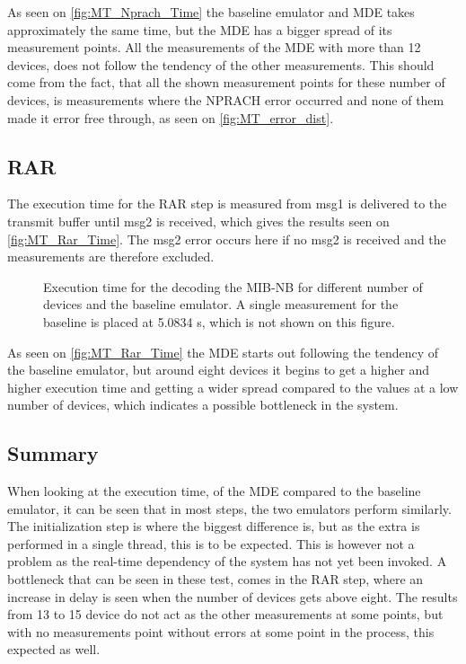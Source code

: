 As seen on \autoref{fig:MT_Nprach_Time} the baseline emulator and MDE takes approximately the same time, but the MDE has a bigger spread of its measurement points. All the measurements of the MDE with more than 12 devices, does not follow the tendency of the other measurements. This should come from the fact, that all the shown measurement points for these number of devices, is measurements where the NPRACH error occurred and none of them made it error free through, as seen on \autoref{fig:MT_error_dist}.

\subsection{RAR}
The execution time for the RAR step is measured from msg1 is delivered to the transmit buffer until msg2 is received, which gives the results seen on \autoref{fig:MT_Rar_Time}. The msg2 error occurs here if no msg2 is received and the measurements are therefore excluded. 

\begin{figure}[H]
\centering
\resizebox{0.5\textwidth}{!}{
}
\caption{Execution time for the decoding the MIB-NB for different number of devices and the baseline emulator. A single measurement for the baseline is placed at 5.0834 s, which is not shown on this figure.}
\label{fig:MT_Rar_Time}
\end{figure}

As seen on \autoref{fig:MT_Rar_Time} the MDE starts out following the tendency of the baseline emulator, but around eight devices it begins to get a higher and higher execution time and getting a wider spread compared to the values at a low number of devices, which indicates a possible bottleneck in the system.

\subsection{Summary}
When looking at the execution time, of the MDE compared to the baseline emulator, it can be seen that in most steps, the two emulators perform similarly. The initialization step is where the biggest difference is, but as the extra is performed in a single thread, this is to be expected. This is however not a problem as the real-time dependency of the system has not yet been invoked. A bottleneck that can be seen in these test, comes in the RAR step, where an increase in delay is seen when the number of devices gets above eight. The results from 13 to 15 device do not act as the other measurements at some points, but with no measurements point without errors at some point in the process, this expected as well. 


